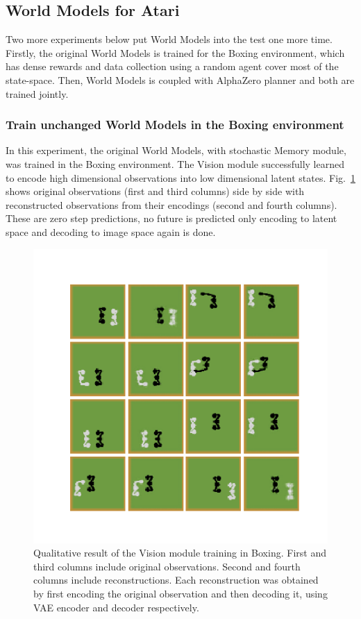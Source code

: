 \subsection{World Models for Atari}

Two more experiments below put World Models into the test one more time. Firstly, the original World Models is trained for the Boxing environment, which has dense rewards and data collection using a random agent cover most of the state-space. Then, World Models is coupled with AlphaZero planner and both are trained jointly.

\subsubsection{Train unchanged World Models in the Boxing environment}

In this experiment, the original World Models, with stochastic Memory module, was trained in the Boxing environment. The Vision module successfully learned to encode high dimensional observations into low dimensional latent states. Fig.~\ref{Fig.WM_Boxing_vision} shows original observations (first and third columns) side by side with reconstructed observations from their encodings (second and fourth columns). These are zero step predictions, no future is predicted only encoding to latent space and decoding to image space again is done.

\begin{figure}[H]
\includegraphics[width=1\textwidth,keepaspectratio]{figures/Boxing_vision.png}
\caption[Qualitative result of the World Models' Vision module training in Boxing]{Qualitative result of the Vision module training in Boxing. First and third columns include original observations. Second and fourth columns include reconstructions. Each reconstruction was obtained by first encoding the original observation and then decoding it, using VAE encoder and decoder respectively.}
\label{Fig.WM_Boxing_vision}
\end{figure}


